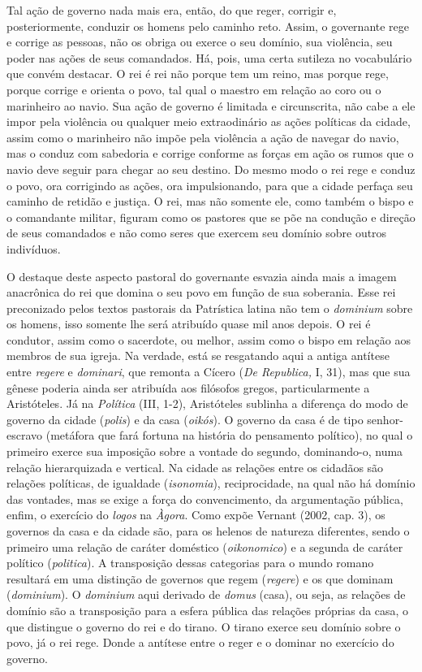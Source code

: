 Tal ação de governo nada mais era, então, do que reger, corrigir e,
posteriormente, conduzir os homens pelo caminho reto. Assim, o
governante rege e corrige as pessoas, não os obriga ou exerce o seu
domínio, sua violência, seu poder nas ações de seus comandados. Há,
pois, uma certa sutileza no vocabulário que convém destacar. O rei é rei
não porque tem um reino, mas porque rege, porque corrige e orienta o
povo, tal qual o maestro em relação ao coro ou o marinheiro ao navio.
Sua ação de governo é limitada e circunscrita, não cabe a ele impor pela
violência ou qualquer meio extraodinário as ações políticas da cidade,
assim como o marinheiro não impõe pela violência a ação de navegar do
navio, mas o conduz com sabedoria e corrige conforme as forças em ação
os rumos que o navio deve seguir para chegar ao seu destino. Do mesmo
modo o rei rege e conduz o povo, ora corrigindo as ações, ora
impulsionando, para que a cidade perfaça seu caminho de retidão e
justiça. O rei, mas não somente ele, como também o bispo e o comandante
militar, figuram como os pastores que se põe na condução e direção de
seus comandados e não como seres que exercem seu domínio sobre outros
indivíduos.

O destaque deste aspecto pastoral do governante esvazia ainda mais a
imagem anacrônica do rei que domina o seu povo em função de sua
soberania. Esse rei preconizado pelos textos pastorais da Patrística
latina não tem o \emph{dominium} sobre os homens, isso somente lhe será
atribuído quase mil anos depois. O rei é condutor, assim como o
sacerdote, ou melhor, assim como o bispo em relação aos membros de sua
igreja. Na verdade, está se resgatando aqui a antiga antítese entre
\emph{regere} e \emph{dominari}, que remonta a Cícero (\emph{De
Republica,} I, 31), mas que sua gênese poderia ainda ser atribuída aos
filósofos gregos, particularmente a Aristóteles. Já na \emph{Política}
(III, 1-2), Aristóteles sublinha a diferença do modo de governo da
cidade (\emph{polis}) e da casa (\emph{oikós}). O governo da casa é de
tipo senhor-escravo (metáfora que fará fortuna na história do pensamento
político), no qual o primeiro exerce sua imposição sobre a vontade do
segundo, dominando-o, numa relação hierarquizada e vertical. Na cidade
as relações entre os cidadãos são relações políticas, de igualdade
(\emph{isonomia}), reciprocidade, na qual não há domínio das vontades,
mas se exige a força do convencimento, da argumentação pública, enfim, o
exercício do \emph{logos} na \emph{Àgora}. Como expõe Vernant (2002,
cap. 3), os governos da casa e da cidade são, para os helenos de
natureza diferentes, sendo o primeiro uma relação de caráter doméstico
(\emph{oikonomico}) e a segunda de caráter político (\emph{politica}). A
transposição dessas categorias para o mundo romano resultará em uma
distinção de governos que regem (\emph{regere}) e os que dominam
(\emph{dominium}). O \emph{dominium} aqui derivado de \emph{domus}
(casa), ou seja, as relações de domínio são a transposição para a esfera
pública das relações próprias da casa, o que distingue o governo do rei
e do tirano. O tirano exerce seu domínio sobre o povo, já o rei rege.
Donde a antítese entre o reger e o dominar no exercício do governo.


